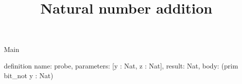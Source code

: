 \begin{lexlean}{Main}
\title{Natural number addition}
\begin{semanticmodule}
definition{
  name: probe,
  parameters: [y : Nat, z : Nat],
  result: Nat,
  body: (prim bit_not y : Nat)
}
\end{semanticmodule}
\end{lexlean}
